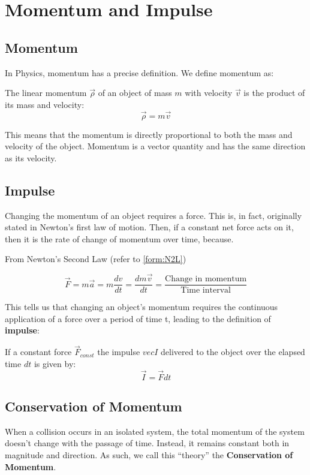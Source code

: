 \section{Momentum and Impulse}
 \subsection{Momentum}
 In Physics, momentum has a precise definition. We define momentum as:
 \begin{defi}[Momentum]
 The linear momentum $\vec{\rho}$ of an object of mass $m$ with velocity $\vec{v}$ is the product of its mass and velocity:
 $$\vec{\rho} = m\vec{v}$$
 \end{defi}
 This means that the momentum is directly proportional to both the mass and velocity of the object. Momentum is a vector quantity and has the same direction as its velocity.
 
 \subsection{Impulse}
 Changing the momentum of an object requires a force. This is, in fact, originally stated in Newton's first law of motion. Then, if a constant net force acts on it, then it is the rate of change of momentum over time, because.
 
 From Newton's Second Law (refer to \ref{form:N2L})
 
$$\vec{F} = m\vec{a} = m\frac{d v}{d t} = \frac{d m\vec{v}}{d t} = \frac{\text{Change in momentum}}{\text{Time interval}}$$

This tells us that changing an object's momentum requires the continuous application of a force over
a period of time t, leading to the definition of \textbf{impulse}:
 
 \begin{defi}[Impulse]
 If a constant force $\vec{F}_{const}$ the impulse $vec{I}$ delivered to the object over the elapsed time $d t$ is given by:
 $$\vec{I} = \vec{F} d t$$
 \end{defi}
 
 \subsection{Conservation of Momentum} \label{sec::com}
 When a collision occurs in an isolated system, the total momentum of the system doesn't change with the passage of time. Instead, it remains constant both in magnitude and direction. As such, we call this ``theory'' the \textbf{Conservation of Momentum}.
 
